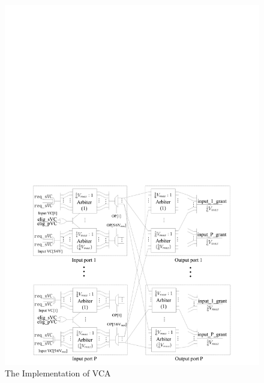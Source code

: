 \documentclass[10pt,conference]{IEEEtran}
\begin{document}
\begin{figure}
\centering\includegraphics[scale=0.25]{figures/vcalloc.pdf}
\caption{The Implementation of VCA}\label{vcallocator}
\end{figure}
\end{document}
